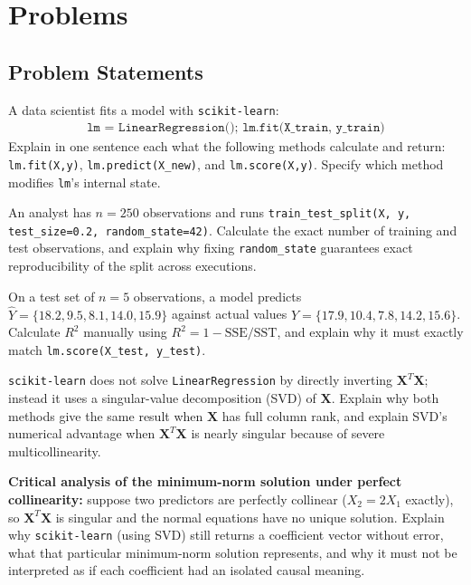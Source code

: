 \section*{Problems}

\subsection*{Problem Statements}

\begin{problema}
\label{prob:eaaa432}
A data scientist fits a model with \texttt{scikit-learn}:
\begin{align}
\texttt{lm = LinearRegression(); lm.fit(X\_train, y\_train)}
\end{align}
Explain in one sentence each what the following methods calculate and return: \texttt{lm.fit(X,y)}, \texttt{lm.predict(X\_new)}, and \texttt{lm.score(X,y)}. Specify which method modifies \texttt{lm}'s internal state.
\end{problema}

\begin{problema}
\label{prob:ab54576}
An analyst has $n=250$ observations and runs \texttt{train\_test\_split(X, y, test\_size=0.2, random\_state=42)}. Calculate the exact number of training and test observations, and explain why fixing \texttt{random\_state} guarantees exact reproducibility of the split across executions.
\end{problema}

\begin{problema}
\label{prob:7554cf7}
On a test set of $n=5$ observations, a model predicts $\hat Y=\{18.2,9.5,8.1,14.0,15.9\}$ against actual values $Y=\{17.9,10.4,7.8,14.2,15.6\}$. Calculate $R^2$ manually using $R^2=1-\text{SSE}/\text{SST}$, and explain why it must exactly match \texttt{lm.score(X\_test, y\_test)}.
\end{problema}

\begin{problema}
\label{prob:011e008}
\texttt{scikit-learn} does not solve \texttt{LinearRegression} by directly inverting $\mathbf X^T\mathbf X$; instead it uses a singular-value decomposition (SVD) of $\mathbf X$. Explain why both methods give the same result when $\mathbf X$ has full column rank, and explain SVD's numerical advantage when $\mathbf X^T\mathbf X$ is nearly singular because of severe multicollinearity.
\end{problema}

\begin{problema}
\label{prob:5ad88f8}
\textbf{Critical analysis of the minimum-norm solution under perfect collinearity:} suppose two predictors are perfectly collinear ($X_2=2X_1$ exactly), so $\mathbf X^T\mathbf X$ is singular and the normal equations have no unique solution. Explain why \texttt{scikit-learn} (using SVD) still returns a coefficient vector without error, what that particular minimum-norm solution represents, and why it must not be interpreted as if each coefficient had an isolated causal meaning.
\end{problema}

